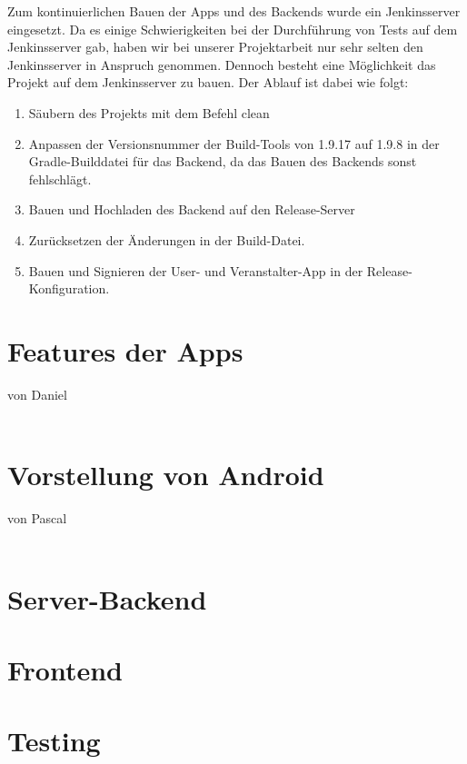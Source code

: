 \documentclass[a4paper, titlepage]{scrartcl}
\newcommand{\AUTHOR}[1]{
	von #1 \\ \\
}
\begin{document}
Zum kontinuierlichen Bauen der Apps und des Backends wurde ein Jenkinsserver eingesetzt. Da es einige Schwierigkeiten bei der Durchführung von Tests auf dem Jenkinsserver gab, haben wir bei unserer Projektarbeit nur sehr selten den Jenkinsserver in Anspruch genommen. Dennoch besteht eine Möglichkeit das Projekt auf dem Jenkinsserver zu bauen. Der Ablauf ist dabei wie folgt:

\begin{enumerate}
	\item Säubern des Projekts mit dem Befehl \glqq clean\grqq
	\item Anpassen der Versionsnummer der Build-Tools von 1.9.17 auf 1.9.8 in der Gradle-Builddatei für das Backend, da das Bauen des Backends sonst fehlschlägt.
	\item Bauen und Hochladen des Backend auf den Release-Server
	\item Zurücksetzen der Änderungen in der Build-Datei.
	\item Bauen und Signieren der User- und Veranstalter-App in der Release-Konfiguration.
\end{enumerate}

\section{Features der Apps}
\AUTHOR{Daniel}

\section{Vorstellung von Android}
\AUTHOR{Pascal}

\section{Server-Backend}


\section{Frontend}


\section{Testing}

\end{document}
